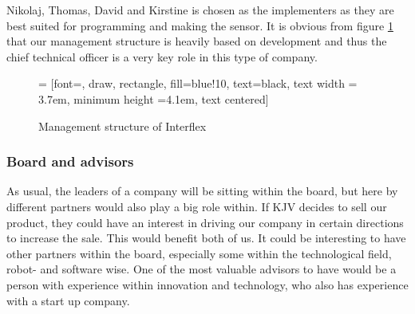 Nikolaj, Thomas, David and Kirstine is chosen as the implementers as they are best suited for programming and making the sensor.
It is obvious from figure \ref{management_structure} that our management structure is heavily based on development and thus the chief technical officer is a very key role in this type of company.

\begin{figure}[ht]
\centering
     = [font=\footnotesize, draw, rectangle, fill=blue!10, text=black, text width = 3.7em, minimum height =4.1em, text centered]
  \caption{Management structure of Interflex}
  \label{management_structure}
\end{figure}


\subsubsection{Board and advisors}
As usual, the leaders of a company will be sitting within the board, but here by different partners would also play a big role within. If KJV decides to sell our product, they could have an interest in driving our company in certain directions to increase the sale. This would benefit both of us. 
It could be interesting to have other partners within the board, especially some within the technological field, robot- and software wise.
One of the most valuable advisors to have would be a person with experience within innovation and technology, who also has experience with a start up company. 
